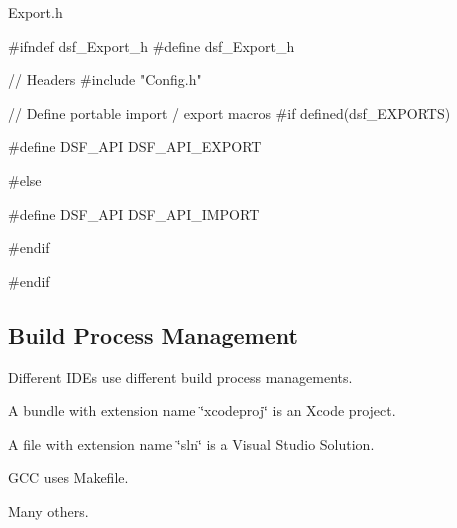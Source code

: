 \begin{DoxyParagraph}{Export.h}

\begin{DoxyCode}
\textcolor{preprocessor}{#ifndef dsf\_Export\_h}
\textcolor{preprocessor}{#define dsf\_Export\_h}

\textcolor{comment}{// Headers}
\textcolor{comment}{}\textcolor{preprocessor}{#include "Config.h"}


\textcolor{comment}{// Define portable import / export macros}
\textcolor{comment}{}\textcolor{preprocessor}{#if defined(dsf\_EXPORTS)}

\textcolor{preprocessor}{#define DSF\_API DSF\_API\_EXPORT}

\textcolor{preprocessor}{#else}

\textcolor{preprocessor}{#define DSF\_API DSF\_API\_IMPORT}

\textcolor{preprocessor}{#endif}

\textcolor{preprocessor}{#endif}
\end{DoxyCode}

\end{DoxyParagraph}
\hypertarget{_conformanceto_specificationand_design_manual_StartDevelopmentBuildProcessManagement}{}\subsection{Build Process Management}\label{_conformanceto_specificationand_design_manual_StartDevelopmentBuildProcessManagement}
Different I\+D\+Es use different build process managements.
\begin{DoxyItemize}
\item A bundle with extension name \char`\"{}xcodeproj\char`\"{} is an Xcode project.
\item A file with extension name \char`\"{}sln\char`\"{} is a Visual Studio Solution.
\item G\+C\+C uses Makefile.
\item Many others.
\end{DoxyItemize}

